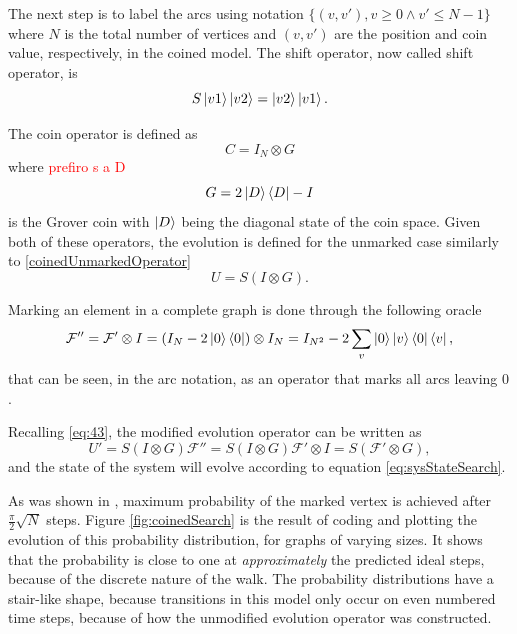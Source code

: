                 The next step is to label the arcs using notation $\{(v,v'), v \geqslant 0 \land v' \leqslant N-1\}$ 
                where $N$ is the total number of vertices and $(v,v')$ are the position and coin value, respectively, in the coined model. 
                The shift operator, now called  shift operator, is
                \begin{equation}
                    S\ket{v1}\ket{v2} = \ket{v2}\ket{v1}.
                \end{equation}\par
                The coin operator is defined as
                \begin{equation}
                    C = I_N \otimes G
                \end{equation}
                where \textcolor{red}{prefiro s a D}
                \begin{equation}
                    G = 2\ket{D}\bra{D} - I
                \end{equation}
                is the Grover coin with $\ket{D}$ being the diagonal state of the coin space. Given both of these operators, the evolution is defined for the unmarked case similarly to \ref{coinedUnmarkedOperator}
                \begin{equation}
                    U = S(I \otimes G).
                \end{equation}\par
                Marking an element in a complete graph is done through the following oracle
                \begin{equation}
                    \mathcal{F''} =\mathcal{F'}\otimes I = (I_N - 2\ket{0}\bra{0})\otimes I_N = I_{N^2} - 2 \sum_v \ket{0}\ket{v}\bra{0}\bra{v} ,
                \end{equation}
                that can be seen, in the arc notation, as an operator that marks all arcs leaving $0$.\par
                Recalling \ref{eq:43}, the modified evolution operator can be written as
                \begin{equation}
                    U' = S(I \otimes G)\mathcal{F''} = S(I \otimes G)\mathcal{F'} \otimes I = S (\mathcal{F'} \otimes G),\label{modifiedEvoCoined}
                \end{equation}
                and the state of the system will evolve according to equation \ref{eq:sysStateSearch}.\par
                As was shown in \cite{REN1}, maximum probability of the marked vertex is achieved after $\frac{\pi}{2}\sqrt{N}$ steps. Figure \ref{fig:coinedSearch} is the result of coding and plotting the evolution of this probability distribution, for graphs of varying sizes. It shows that the probability is close to one at \textit{approximately} the predicted ideal steps, because of the discrete nature of the walk. The probability distributions have a stair-like shape, because transitions in this model only occur on even numbered time steps, because of how the unmodified evolution operator was constructed.
                
